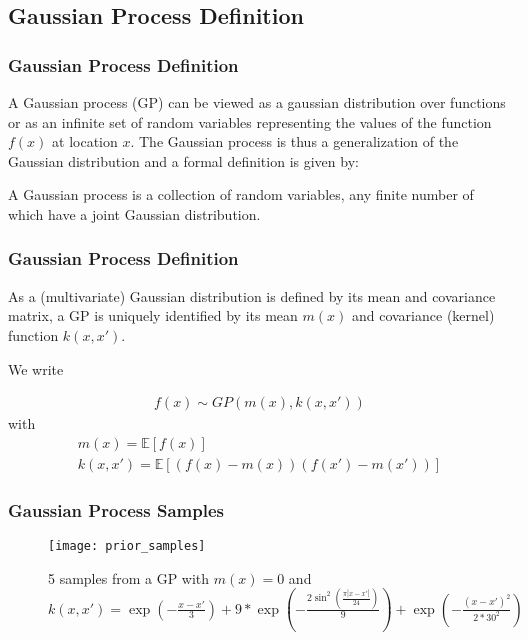 \documentclass[
	8pt, %
]{beamer}
\begin{document}
\subsection{Gaussian Process Definition}

\begin{frame}
	\frametitle{Gaussian Process Definition}


A Gaussian process (GP) can be viewed as a gaussian distribution over functions or as an infinite set of random
variables representing the values of the function $f(x)$ at location $x$.
The Gaussian process is thus a generalization of the Gaussian distribution and a formal definition is given
by:

\begin{definition}\label{def:GP}
 A Gaussian process is a collection of random variables, any finite number of which have a joint Gaussian distribution.
\end{definition}

\end{frame}


\begin{frame}
	\frametitle{Gaussian Process Definition}

As a (multivariate) Gaussian distribution is defined by its mean and covariance matrix, a GP is
uniquely identified by its mean $m(x)$ and covariance (kernel) function $k(x,x')$.

We write

\begin{gather*}
    f(x) \sim GP(m(x), k(x,x'))
\end{gather*}
with
\begin{gather*}
    m(x) = \mathbb{E}[f(x)] \\
    k(x,x') = \mathbb{E}[(f(x)-m(x))(f(x')-m(x'))]
\end{gather*}
\end{frame}


\begin{frame}
	\frametitle{Gaussian Process Samples}

	\begin{figure}
			\texttt{[image: prior\_samples]}
			\caption{5 samples from a GP with $m(x)=0$  and $k(x,x') = \exp(-\frac{x-x'}{3}) +
			9 * \exp(-\frac{2 \sin^2(\frac{\pi |x -x'|}{24})}{9}) + \exp(-\frac{(x-x')^2}{2 * 30^2}) $}
	\end{figure}


\end{frame}
\end{document}
